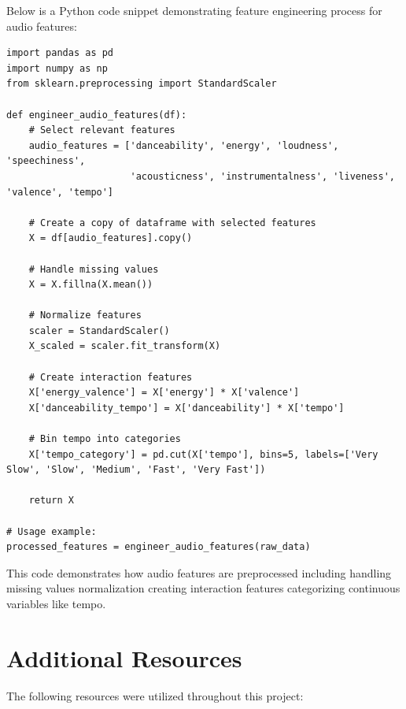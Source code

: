 \documentclass[runningheads]{llncs}
\begin{document}
Below is a Python code snippet demonstrating feature engineering process for audio features:

\begin{verbatim}
import pandas as pd
import numpy as np
from sklearn.preprocessing import StandardScaler

def engineer_audio_features(df):
    # Select relevant features
    audio_features = ['danceability', 'energy', 'loudness', 'speechiness', 
                      'acousticness', 'instrumentalness', 'liveness', 'valence', 'tempo']
    
    # Create a copy of dataframe with selected features
    X = df[audio_features].copy()
    
    # Handle missing values
    X = X.fillna(X.mean())
    
    # Normalize features
    scaler = StandardScaler()
    X_scaled = scaler.fit_transform(X)
    
    # Create interaction features
    X['energy_valence'] = X['energy'] * X['valence']
    X['danceability_tempo'] = X['danceability'] * X['tempo']
    
    # Bin tempo into categories
    X['tempo_category'] = pd.cut(X['tempo'], bins=5, labels=['Very Slow', 'Slow', 'Medium', 'Fast', 'Very Fast'])
    
    return X

# Usage example:
processed_features = engineer_audio_features(raw_data)
\end{verbatim}

This code demonstrates how audio features are preprocessed including handling missing values normalization creating interaction features categorizing continuous variables like tempo.


\section{Additional Resources}
The following resources were utilized throughout this project:
\end{document}
